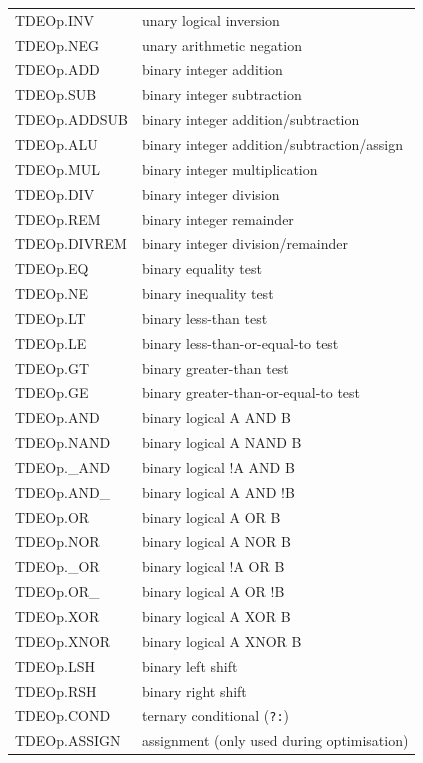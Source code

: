 \documentclass[10pt,a4paper,twoside,fleqn]{book}
\begin{document}
                    \begin{tabular}{| l | l |}
                    \hline
                    TDEOp.INV    & unary logical inversion \\
                    TDEOp.NEG    & unary arithmetic negation \\
                    TDEOp.ADD    & binary integer addition \\
                    TDEOp.SUB    & binary integer subtraction \\
                    TDEOp.ADDSUB & binary integer addition/subtraction \\
                    TDEOp.ALU    & binary integer addition/subtraction/assign \\
                    TDEOp.MUL    & binary integer multiplication \\
                    TDEOp.DIV    & binary integer division \\
                    TDEOp.REM    & binary integer remainder \\
                    TDEOp.DIVREM & binary integer division/remainder \\
                    TDEOp.EQ     & binary equality test \\
                    TDEOp.NE     & binary inequality test \\
                    TDEOp.LT     & binary less-than test \\
                    TDEOp.LE     & binary less-than-or-equal-to test \\
                    TDEOp.GT     & binary greater-than test \\
                    TDEOp.GE     & binary greater-than-or-equal-to test \\
                    TDEOp.AND    & binary logical A AND B \\
                    TDEOp.NAND   & binary logical A NAND B \\
                    TDEOp.\_AND  & binary logical !A AND B\\
                    TDEOp.AND\_  & binary logical A AND !B\\
                    TDEOp.OR     & binary logical A OR B \\
                    TDEOp.NOR    & binary logical A NOR B \\
                    TDEOp.\_OR   & binary logical !A OR B \\
                    TDEOp.OR\_   & binary logical A OR !B \\
                    TDEOp.XOR    & binary logical A XOR B \\
                    TDEOp.XNOR   & binary logical A XNOR B \\
                    TDEOp.LSH    & binary left shift \\
                    TDEOp.RSH    & binary right shift \\
                    TDEOp.COND   & ternary conditional (\verb'?:') \\
                    TDEOp.ASSIGN & assignment (only used during optimisation) \\
                    \hline
                    \end{tabular}
\end{document}
